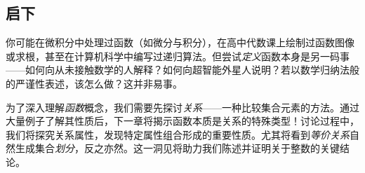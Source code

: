 
\subsection{启下}

你可能在微积分中处理过函数（如微分与积分），在高中代数课上绘制过函数图像或求根，甚至在计算机科学中编写过递归算法。但尝试\emph{定义}函数本身是另一码事——如何向从未接触数学的人解释？如何向超智能外星人说明？若以数学归纳法般的严谨性表述，该怎么做？这并非易事。

为了深入理解\emph{函数}概念，我们需要先探讨\emph{关系}——一种比较集合元素的方法。通过大量例子了解其性质后，下一章将揭示函数本质是关系的特殊类型！讨论过程中，我们将探究关系属性，发现特定属性组合形成的重要性质。尤其将看到\emph{等价关系}自然生成集合\emph{划分}，反之亦然。这一洞见将助力我们陈述并证明关于整数的关键结论。